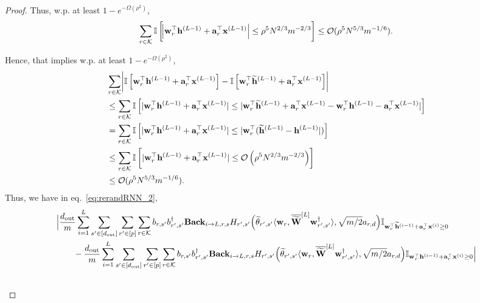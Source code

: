 \begin{proof}
			Thus, w.p. at least $1 - e^{-\Omega(\rho^2)}$,
			\begin{equation*}
				\sum_{r \in \mathcal{K}} \mathbb{I}\left[\abs{\mathbf{w}_r^{\top} \mathbf{h}^{(L-1)} + \mathbf{a}_r^{\top} \mathbf{x}^{(L-1)}} \le \rho^{5} N^{2 / 3} m^{-2 / 3}\right] \le \mathcal{O}(\rho^{5} N^{5 / 3} m^{-1/6}).
			\end{equation*}
			
			Hence, that implies  w.p. at least $1 - e^{-\Omega(\rho^2)}$,
			\begingroup \allowdisplaybreaks
			\begin{align*}
				&\sum_{r \in \mathcal{K}} \abs{\mathbb{I}\left[\mathbf{w}_r^{\top} \mathbf{h}^{(L-1)} + \mathbf{a}_r^{\top} \mathbf{x}^{(L-1)} \right] - \mathbb{I}\left[\mathbf{w}_r^{\top} \widetilde{\mathbf{h}}^{(L-1)} + \mathbf{a}_r^{\top} \mathbf{x}^{(L-1)} \right]}\\&
				\le \sum_{r \in \mathcal{K}}\mathbb{I}\left[\abs[0]{\mathbf{w}_r^{\top} \mathbf{h}^{(L-1)} + \mathbf{a}_r^{\top} \mathbf{x}^{(L-1)}} \le \abs[0]{\mathbf{w}_r^{\top} \widetilde{\mathbf{h}}^{(L-1)} + \mathbf{a}_r^{\top} \mathbf{x}^{(L-1)} - \mathbf{w}_r^{\top} \mathbf{h}^{(L-1)} - \mathbf{a}_r^{\top} \mathbf{x}^{(L-1)}} \right] \\&
				= \sum_{r \in \mathcal{K}}\mathbb{I}\left[\abs[0]{\mathbf{w}_r^{\top} \mathbf{h}^{(L-1)} + \mathbf{a}_r^{\top} \mathbf{x}^{(L-1)}} \le \abs[0]{\mathbf{w}_r^{\top} (\widetilde{\mathbf{h}}^{(L-1)} -  \mathbf{h}^{(L-1)}}) \right]
				\\&\le \sum_{r \in \mathcal{K}}\mathbb{I}\left[\abs[0]{\mathbf{w}_r^{\top} \mathbf{h}^{(L-1)} + \mathbf{a}_r^{\top} \mathbf{x}^{(L-1)}} \le \mathcal{O}\left(\rho^{5} N^{2 / 3} m^{-2 / 3}\right) \right] \\&
				\le \mathcal{O}(\rho^{5} N^{5 / 3} m^{-1/6}).
			\end{align*}  
			\endgroup
			Thus, we have in eq.~\ref{eq:rerandRNN_2},
			\begingroup \allowdisplaybreaks
			\begin{align}
				&\Big| \frac{\dout }{m} \sum_{i=1}^{L}  \sum_{s' \in [\dout ]} \sum_{r' \in [p]} \sum_{r \in \mathcal{K}}  b_{r, s'} b_{r', s'}^{\dagger} \mathbf{Back}_{i \to L, r, s}  H_{r', s'}\Big(\widetilde{\theta}_{r', s'} \langle \mathbf{w}_{r}, \overline{\widetilde{\mathbf{W}}}^{[L]} \mathbf{w}_{r', s'}^{\dagger}\rangle , \sqrt{m/2} a_{r, d}\Big) \mathbb{I}_{\mathbf{w}_r^{\top} \widetilde{\mathbf{h}}^{(i-1)} + \mathbf{a}_r^{\top} \mathbf{x}^{(i)} \ge 0} \nonumber\\&
				\quad \quad -  \frac{\dout }{m} \sum_{i=1}^{L}  \sum_{s' \in [\dout ]} \sum_{r' \in [p]} \sum_{r \in \mathcal{K}}  b_{r, s'} b_{r', s'}^{\dagger} \mathbf{Back}_{i \to L, r, s}  H_{r', s'}\Big(\widetilde{\theta}_{r', s'} \langle \mathbf{w}_{r}, \overline{\widetilde{\mathbf{W}}}^{[L]} \mathbf{w}_{r', s'}^{\dagger}\rangle , \sqrt{m/2} a_{r, d}\Big) \mathbb{I}_{\mathbf{w}_r^{\top} \mathbf{h}^{(i-1)} + \mathbf{a}_r^{\top} \mathbf{x}^{(i)} \ge 0} \Big| \nonumber\\&

\end{align}
\end{proof}
